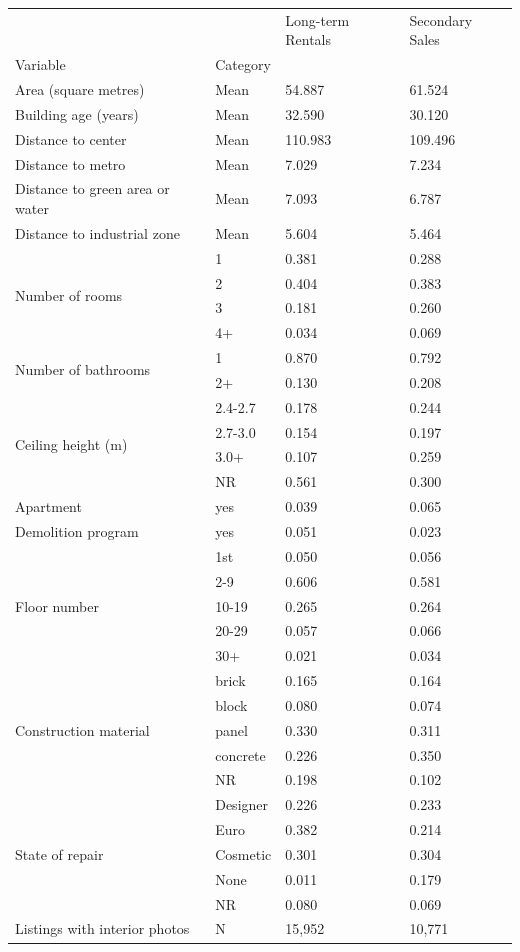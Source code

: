 \begin{tabular}{llll}
\toprule
 &  & Long-term Rentals & Secondary Sales \\
Variable & Category &  &  \\
\midrule
Area (square metres) & Mean & 54.887 & 61.524 \\
\cline{1-4}
Building age (years) & Mean & 32.590 & 30.120 \\
\cline{1-4}
Distance to center & Mean & 110.983 & 109.496 \\
\cline{1-4}
Distance to metro & Mean & 7.029 & 7.234 \\
\cline{1-4}
Distance to green area or water & Mean & 7.093 & 6.787 \\
\cline{1-4}
Distance to industrial zone & Mean & 5.604 & 5.464 \\
\cline{1-4}
\multirow[t]{4}{*}{Number of rooms} & 1 & 0.381 & 0.288 \\
 & 2 & 0.404 & 0.383 \\
 & 3 & 0.181 & 0.260 \\
 & 4+ & 0.034 & 0.069 \\
\cline{1-4}
\multirow[t]{2}{*}{Number of bathrooms} & 1 & 0.870 & 0.792 \\
 & 2+ & 0.130 & 0.208 \\
\cline{1-4}
\multirow[t]{4}{*}{Ceiling height (m)} & 2.4-2.7 & 0.178 & 0.244 \\
 & 2.7-3.0 & 0.154 & 0.197 \\
 & 3.0+ & 0.107 & 0.259 \\
 & NR & 0.561 & 0.300 \\
\cline{1-4}
Apartment & yes & 0.039 & 0.065 \\
\cline{1-4}
Demolition program & yes & 0.051 & 0.023 \\
\cline{1-4}
\multirow[t]{5}{*}{Floor number} & 1st & 0.050 & 0.056 \\
 & 2-9 & 0.606 & 0.581 \\
 & 10-19 & 0.265 & 0.264 \\
 & 20-29 & 0.057 & 0.066 \\
 & 30+ & 0.021 & 0.034 \\
\cline{1-4}
\multirow[t]{5}{*}{Construction material} & brick & 0.165 & 0.164 \\
 & block & 0.080 & 0.074 \\
 & panel & 0.330 & 0.311 \\
 & concrete & 0.226 & 0.350 \\
 & NR & 0.198 & 0.102 \\
\cline{1-4}
\multirow[t]{5}{*}{State of repair} & Designer & 0.226 & 0.233 \\
 & Euro & 0.382 & 0.214 \\
 & Cosmetic & 0.301 & 0.304 \\
 & None & 0.011 & 0.179 \\
 & NR & 0.080 & 0.069 \\
\cline{1-4}
Listings with interior photos & N & 15,952 & 10,771 \\
\cline{1-4}
\bottomrule
\end{tabular}
